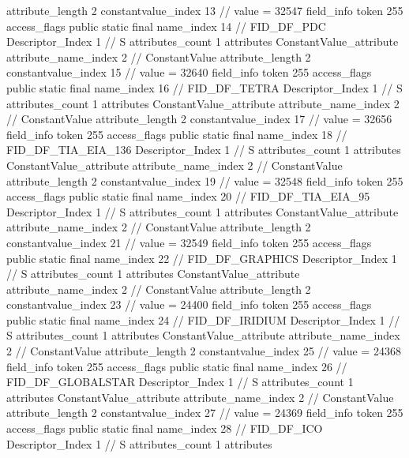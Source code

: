 {{{{{{{					attribute_length	2
					constantvalue_index	13		// value = 32547
				}
				}
			}
			field_info {
				token	255
				access_flags	public static final
				name_index	14		// FID_DF_PDC
				Descriptor_Index	1		// S
				attributes_count	1
				attributes {
				ConstantValue_attribute {
					attribute_name_index	2		// ConstantValue
					attribute_length	2
					constantvalue_index	15		// value = 32640
				}
				}
			}
			field_info {
				token	255
				access_flags	public static final
				name_index	16		// FID_DF_TETRA
				Descriptor_Index	1		// S
				attributes_count	1
				attributes {
				ConstantValue_attribute {
					attribute_name_index	2		// ConstantValue
					attribute_length	2
					constantvalue_index	17		// value = 32656
				}
				}
			}
			field_info {
				token	255
				access_flags	public static final
				name_index	18		// FID_DF_TIA_EIA_136
				Descriptor_Index	1		// S
				attributes_count	1
				attributes {
				ConstantValue_attribute {
					attribute_name_index	2		// ConstantValue
					attribute_length	2
					constantvalue_index	19		// value = 32548
				}
				}
			}
			field_info {
				token	255
				access_flags	public static final
				name_index	20		// FID_DF_TIA_EIA_95
				Descriptor_Index	1		// S
				attributes_count	1
				attributes {
				ConstantValue_attribute {
					attribute_name_index	2		// ConstantValue
					attribute_length	2
					constantvalue_index	21		// value = 32549
				}
				}
			}
			field_info {
				token	255
				access_flags	public static final
				name_index	22		// FID_DF_GRAPHICS
				Descriptor_Index	1		// S
				attributes_count	1
				attributes {
				ConstantValue_attribute {
					attribute_name_index	2		// ConstantValue
					attribute_length	2
					constantvalue_index	23		// value = 24400
				}
				}
			}
			field_info {
				token	255
				access_flags	public static final
				name_index	24		// FID_DF_IRIDIUM
				Descriptor_Index	1		// S
				attributes_count	1
				attributes {
				ConstantValue_attribute {
					attribute_name_index	2		// ConstantValue
					attribute_length	2
					constantvalue_index	25		// value = 24368
				}
				}
			}
			field_info {
				token	255
				access_flags	public static final
				name_index	26		// FID_DF_GLOBALSTAR
				Descriptor_Index	1		// S
				attributes_count	1
				attributes {
				ConstantValue_attribute {
					attribute_name_index	2		// ConstantValue
					attribute_length	2
					constantvalue_index	27		// value = 24369
				}
				}
			}
			field_info {
				token	255
				access_flags	public static final
				name_index	28		// FID_DF_ICO
				Descriptor_Index	1		// S
				attributes_count	1
				attributes {
}}}}}}
